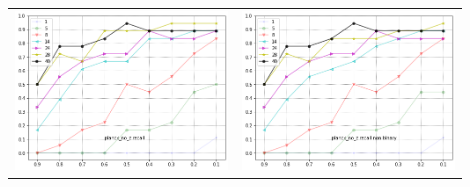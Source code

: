 \documentclass{article}
\begin{document}
\begin{enumerate}
\begin{table}[h!]
\begin{tabular}{p{0.45\linewidth}p{0.45\linewidth}}
            \includegraphics[width=\linewidth]{pnz} & \includegraphics[width=\linewidth]{pnz_non_binary}\\ 

\end{tabular}
\end{table}
\end{enumerate}
\end{document}
